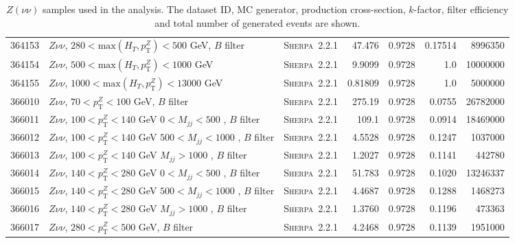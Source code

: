 \begin{table}[!htb]
{\begin{tabular}{lllrrrr}
    364153 & $Z \nu\nu $, $280<\text{max}(H_T,p_{\text{T}}^Z)<500$ GeV, $B$ filter & \textsc{Sherpa}~2.2.1 &            47.476   & 0.9728& 0.17514  &  8996350 \\
    364154 & $Z \nu\nu $, $500<\text{max}(H_T,p_{\text{T}}^Z)<1000$ GeV                      & \textsc{Sherpa}~2.2.1 &  9.9099   & 0.9728& 1.0 	 & 10000000 \\
    364155 & $Z \nu\nu $, $1000<\text{max}(H_T,p_{\text{T}}^Z)<13000$ GeV                      & \textsc{Sherpa}~2.2.1 &0.81809  & 0.9728& 1.0 	 &  5000000 \\
    366010 & $Z \nu\nu $, $70<p_{\text{T}}^Z<100$ GeV, $B$ filter & \textsc{Sherpa}~2.2.1 & 275.19 & 0.9728 & 0.0755 & 26782000\\
    366011 & $Z \nu\nu $, $100<p_{\text{T}}^Z<140$ GeV $0<M_{jj}<500$ , $B$ filter & \textsc{Sherpa}~2.2.1 & 109.1 & 0.9728 & 0.0914 & 18469000\\
    366012 & $Z \nu\nu $, $100<p_{\text{T}}^Z<140$ GeV $500<M_{jj}<1000$ , $B$ filter &  \textsc{Sherpa}~2.2.1 & 4.5528 & 0.9728 & 0.1247 & 1037000\\
    366013 & $Z \nu\nu $, $100<p_{\text{T}}^Z<140$ GeV $M_{jj}>1000$ , $B$ filter &\textsc{Sherpa}~2.2.1 & 1.2027 & 0.9728 & 0.1141 & 442780\\
    366014 & $Z \nu\nu $, $140<p_{\text{T}}^Z<280$ GeV $0<M_{jj}<500$ , $B$ filter &  \textsc{Sherpa}~2.2.1 & 51.783 & 0.9728 & 0.1020 &  13246337\\
    366015 & $Z \nu\nu $, $140<p_{\text{T}}^Z<280$ GeV $500<M_{jj}<1000$ , $B$ filter &  \textsc{Sherpa}~2.2.1 & 4.4687 & 0.9728 & 0.1288 & 1468273\\
    366016 & $Z \nu\nu $, $140<p_{\text{T}}^Z<280$ GeV $M_{jj}>1000$ , $B$ filter &  \textsc{Sherpa}~2.2.1 & 1.3760 & 0.9728 & 0.1196 & 473363\\
    366017 & $Z \nu\nu $, $280<p_{\text{T}}^Z<500$ GeV, $B$ filter &  \textsc{Sherpa}~2.2.1 & 4.2468 & 0.9728 & 0.1139 & 1951000\\
    \bottomrule
  \end{tabular}
  }
  \caption{$Z(\nu\nu)$ samples used in the analysis. The dataset ID, MC
    generator, production cross-section, $k$-factor, filter efficiency and total
    number of generated events are shown.}
  \label{tabular:mc_samples_Zvvjets}
\end{table}